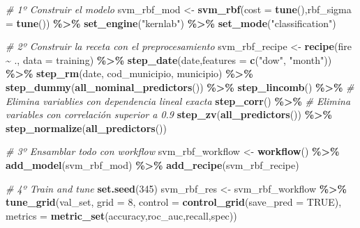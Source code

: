 \documentclass[12pt,a4paper,]{book}
\newenvironment{Shaded}{\begin{snugshade}}{\end{snugshade}}
\newcommand{\AttributeTok}[1]{\textcolor[rgb]{0.13,0.29,0.53}{#1}}
\newcommand{\CommentTok}[1]{\textcolor[rgb]{0.56,0.35,0.01}{\textit{#1}}}
\newcommand{\ConstantTok}[1]{\textcolor[rgb]{0.56,0.35,0.01}{#1}}
\newcommand{\DecValTok}[1]{\textcolor[rgb]{0.00,0.00,0.81}{#1}}
\newcommand{\FunctionTok}[1]{\textcolor[rgb]{0.13,0.29,0.53}{\textbf{#1}}}
\newcommand{\NormalTok}[1]{#1}
\newcommand{\OtherTok}[1]{\textcolor[rgb]{0.56,0.35,0.01}{#1}}
\newcommand{\SpecialCharTok}[1]{\textcolor[rgb]{0.81,0.36,0.00}{\textbf{#1}}}
\newcommand{\StringTok}[1]{\textcolor[rgb]{0.31,0.60,0.02}{#1}}
\newcounter{dummy}
\numberwithin{dummy}{section}
\theoremstyle{ocrenumbox}
\theoremstyle{blacknumex}
\theoremstyle{blacknumbox}
\theoremstyle{ocrenum}
\theoremstyle{ocrenum}
\begin{document}
\begin{Shaded}
\begin{Highlighting}[]
\CommentTok{\# 1º Construir el modelo}
\NormalTok{svm\_rbf\_mod }\OtherTok{\textless{}{-}} 
  \FunctionTok{svm\_rbf}\NormalTok{(}\AttributeTok{cost =} \FunctionTok{tune}\NormalTok{(),}\AttributeTok{rbf\_sigma =} \FunctionTok{tune}\NormalTok{()) }\SpecialCharTok{\%\textgreater{}\%} 
  \FunctionTok{set\_engine}\NormalTok{(}\StringTok{"kernlab"}\NormalTok{) }\SpecialCharTok{\%\textgreater{}\%} 
  \FunctionTok{set\_mode}\NormalTok{(}\StringTok{"classification"}\NormalTok{)}

\CommentTok{\# 2º Construir la receta con el preprocesamiento}
\NormalTok{svm\_rbf\_recipe }\OtherTok{\textless{}{-}} 
  \FunctionTok{recipe}\NormalTok{(fire }\SpecialCharTok{\textasciitilde{}}\NormalTok{ ., }\AttributeTok{data =}\NormalTok{ training) }\SpecialCharTok{\%\textgreater{}\%} 
  \FunctionTok{step\_date}\NormalTok{(date,}\AttributeTok{features =} \FunctionTok{c}\NormalTok{(}\StringTok{"dow"}\NormalTok{, }\StringTok{"month"}\NormalTok{)) }\SpecialCharTok{\%\textgreater{}\%} 
  \FunctionTok{step\_rm}\NormalTok{(date, cod\_municipio, municipio) }\SpecialCharTok{\%\textgreater{}\%}
  \FunctionTok{step\_dummy}\NormalTok{(}\FunctionTok{all\_nominal\_predictors}\NormalTok{()) }\SpecialCharTok{\%\textgreater{}\%} 
  \FunctionTok{step\_lincomb}\NormalTok{() }\SpecialCharTok{\%\textgreater{}\%} \CommentTok{\# Elimina variablies con dependencia lineal exacta}
  \FunctionTok{step\_corr}\NormalTok{() }\SpecialCharTok{\%\textgreater{}\%} \CommentTok{\# Elimina variables con correlación superior a 0.9}
  \FunctionTok{step\_zv}\NormalTok{(}\FunctionTok{all\_predictors}\NormalTok{()) }\SpecialCharTok{\%\textgreater{}\%} 
  \FunctionTok{step\_normalize}\NormalTok{(}\FunctionTok{all\_predictors}\NormalTok{())}

\CommentTok{\# 3º Ensamblar todo con workflow}
\NormalTok{svm\_rbf\_workflow }\OtherTok{\textless{}{-}} 
  \FunctionTok{workflow}\NormalTok{() }\SpecialCharTok{\%\textgreater{}\%} 
  \FunctionTok{add\_model}\NormalTok{(svm\_rbf\_mod) }\SpecialCharTok{\%\textgreater{}\%} 
  \FunctionTok{add\_recipe}\NormalTok{(svm\_rbf\_recipe)}

\CommentTok{\# 4º Train and tune}
\FunctionTok{set.seed}\NormalTok{(}\DecValTok{345}\NormalTok{)}
\NormalTok{svm\_rbf\_res }\OtherTok{\textless{}{-}} 
\NormalTok{  svm\_rbf\_workflow }\SpecialCharTok{\%\textgreater{}\%} 
  \FunctionTok{tune\_grid}\NormalTok{(val\_set,}
            \AttributeTok{grid =} \DecValTok{8}\NormalTok{,}
            \AttributeTok{control =} \FunctionTok{control\_grid}\NormalTok{(}\AttributeTok{save\_pred =} \ConstantTok{TRUE}\NormalTok{),}
            \AttributeTok{metrics =} \FunctionTok{metric\_set}\NormalTok{(accuracy,roc\_auc,recall,spec))}


\end{Highlighting}
\end{Shaded}
\end{document}
